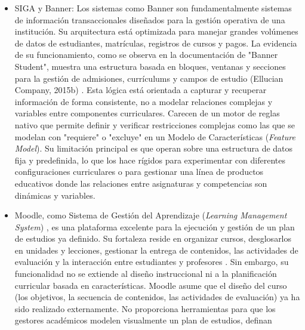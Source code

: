 {{        
        \begin{itemize}
            \item SIGA y Banner: Los sistemas como Banner son fundamentalmente
            sistemas de información transaccionales diseñados para la gestión
            operativa de una institución. Su arquitectura está optimizada para
            manejar grandes volúmenes de datos de estudiantes, matrículas,
            registros de cursos y pagos. La evidencia de su funcionamiento, como
            se observa en la documentación de "Banner Student", muestra una
            estructura basada en bloques, ventanas y secciones para la gestión de
            admisiones, currículums y campos de estudio (Ellucian Company,
            2015b) \citep{ellucian2015b_banner}. Esta lógica está orientada a capturar y recuperar información de
            forma consistente, no a modelar relaciones complejas y variables entre
            componentes curriculares. Carecen de un motor de reglas nativo que permite definir y verificar restricciones complejas como las que se
            modelan con "requiere" o "excluye" en un Modelo de Características (\textit{Feature Model}). Su limitación
            principal es que operan sobre una estructura de datos fija y predefinida,
            lo que los hace rígidos para experimentar con diferentes configuraciones
            curriculares o para gestionar una línea de productos educativos donde
            las relaciones entre asignaturas y competencias son dinámicas y
            variables.
            \item Moodle, como Sistema de Gestión del Aprendizaje (\textit{Learning Management System}) \citep{moodle2025overview}, es una plataforma excelente para la ejecución y gestión de
            un plan de estudios ya definido. Su fortaleza reside en organizar cursos,
            desglosarlos en unidades y lecciones, gestionar la entrega de
            contenidos, las actividades de evaluación y la interacción entre
            estudiantes y profesores \citep{moodle2025overview}. Sin embargo, su funcionalidad no se extiende
            al diseño instruccional ni a la planificación curricular basada en
            características. Moodle asume que el diseño del curso (los objetivos, la
            secuencia de contenidos, las actividades de evaluación) ya ha sido
            realizado externamente. No proporciona herramientas para que los
            gestores académicos modelen visualmente un plan de estudios, definan

\end{itemize}}}
